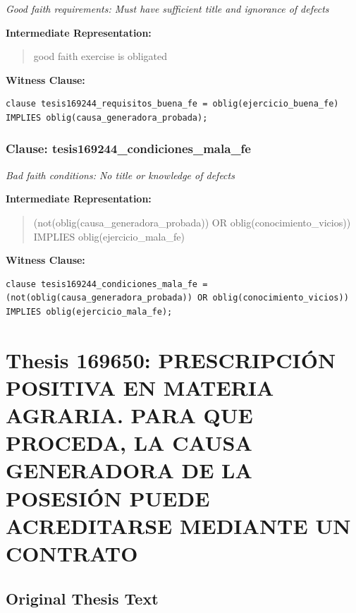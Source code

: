 \documentclass[11pt,a4paper]{article}
\begin{document}
\textit{Good faith requirements: Must have sufficient title and ignorance of defects}

\textbf{Intermediate Representation:}

\begin{quote}
good faith exercise is obligated
\end{quote}

\textbf{Witness Clause:}

\begin{lstlisting}[style=witnessstyle, language=Witness]
clause tesis169244_requisitos_buena_fe = oblig(ejercicio_buena_fe) IMPLIES oblig(causa_generadora_probada);
\end{lstlisting}

\subsubsection{Clause: tesis169244\_condiciones\_mala\_fe}

\textit{Bad faith conditions: No title or knowledge of defects}

\textbf{Intermediate Representation:}

\begin{quote}
(not(oblig(causa\_generadora\_probada)) OR oblig(conocimiento\_vicios)) IMPLIES oblig(ejercicio\_mala\_fe)
\end{quote}

\textbf{Witness Clause:}

\begin{lstlisting}[style=witnessstyle, language=Witness]
clause tesis169244_condiciones_mala_fe = (not(oblig(causa_generadora_probada)) OR oblig(conocimiento_vicios)) IMPLIES oblig(ejercicio_mala_fe);
\end{lstlisting}

\newpage

\section{Thesis 169650: PRESCRIPCIÓN POSITIVA EN MATERIA AGRARIA. PARA QUE PROCEDA, LA CAUSA GENERADORA DE LA POSESIÓN PUEDE ACREDITARSE MEDIANTE UN CONTRATO}
\label{thesis:169650}

\subsection{Original Thesis Text}
\end{document}
